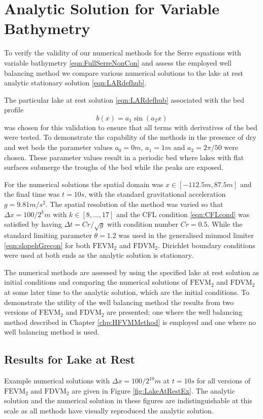 \section{Analytic Solution for Variable Bathymetry}
To verify the validity of our numerical methods for the Serre equations with variable bathymetry \eqref{eqn:FullSerreNonCon} and assess the employed well balancing method we compare various numerical solutions to the lake at rest analytic stationary solution \eqref{eqn:LARdefhub}. 

The particular lake at rest solution \eqref{eqn:LARdefhub} associated with the bed profile
\begin{equation}
b(x) = a_1 \sin\left(a_2 x\right)
\end{equation}
was chosen for this validation to ensure that all terms with derivatives of the bed were tested. To demonstrate the capability of the methods in the presence of dry and wet beds the parameter values $a_0 = 0m$, $a_1 = 1m$ and $a_2 = 2 \pi / 50 $ were chosen. These parameter values result in a periodic bed where lakes with flat surfaces submerge the troughs of the bed while the peaks are exposed. 

For the numerical solutions the spatial domain was $x \in \left[-112.5 m,87.5 m\right]$ and the final time was $t=10s$, with the standard gravitational acceleration $g= 9.81 m/s^2$. The spatial resolution of the method was varied so that $\Delta x = 100 / 2^k m$ with $k \in \left[8, \dots  ,17\right]$ and the CFL condition \eqref{eqn:CFLcond} was satisfied by having $\Delta t = Cr / \sqrt{g}$ with condition number $Cr = 0.5$. While the standard limiting parameter $\theta = 1.2$ was used in the generalised minmod limiter \eqref{eqn:slopehGrecon} for both $\text{FEVM}_2$ and $\text{FDVM}_2$. Dirichlet boundary conditions were used at both ends as the analytic solution is stationary.

The numerical methods are assessed by using the specified lake at rest solution as initial conditions and comparing the numerical solutions of $\text{FEVM}_2$ and $\text{FDVM}_2$ at some later time to the analytic solution, which are the initial conditions. To demonstrate the utility of the well balancing method the results from two versions of $\text{FEVM}_2$ and $\text{FDVM}_2$ are presented; one where the well balancing method described in Chapter \ref{chp:HFVMMethod} is employed and one where no well balancing method is used.   

\subsection{Results for Lake at Rest}
Example numerical solutions with $\Delta x = 100/2^{10}m$ at $t=10s$ for all versions of $\text{FEVM}_2$ and $\text{FDVM}_2$ are given in Figure \ref{fig:LakeAtRestEx}. The analytic solution and the numerical solution in these figures are indistinguishable at this scale as all methods have visually reproduced the analytic solution.  

